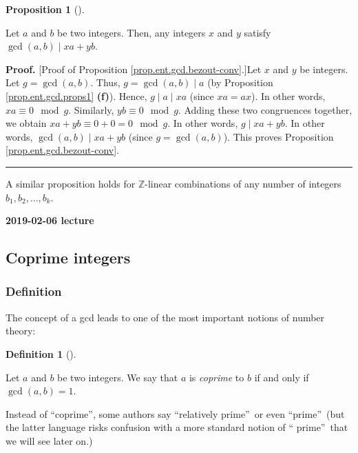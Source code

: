 \documentclass[numbers=enddot,12pt,final,onecolumn,notitlepage]{scrartcl}%
\numberwithin{exer}{subsection}
\theoremstyle{definition}
\newtheorem{prop}[theo]{Proposition}
\newenvironment{proposition}[1][]
{\begin{prop}[#1]\begin{leftbar}}
{\end{leftbar}\end{prop}}
\newtheorem{defi}[theo]{Definition}
\newenvironment{definition}[1][]
{\begin{defi}[#1]\begin{leftbar}}
{\end{leftbar}\end{defi}}
\newenvironment{proof}[1][Proof]{\noindent\textbf{#1.} }{\ \rule{0.5em}{0.5em}}
\begin{document}
\begin{proposition}
\label{prop.ent.gcd.bezout-conv}Let $a$ and $b$ be two integers. Then, any
integers $x$ and $y$ satisfy $\gcd\left(  a, b \right)  \mid xa + yb$.
\end{proposition}

\begin{proof}
[Proof of Proposition \ref{prop.ent.gcd.bezout-conv}.]Let $x$ and $y$ be
integers. Let $g = \gcd\left(  a, b \right)  $. Thus, $g = \gcd\left(  a, b
\right)  \mid a$ (by Proposition \ref{prop.ent.gcd.props1} \textbf{(f)}).
Hence, $g \mid a \mid xa$ (since $xa = ax$). In other words, $xa \equiv0
\mod g$. Similarly, $yb \equiv0 \mod g$. Adding these two congruences
together, we obtain $xa + yb \equiv0 + 0 = 0 \mod g$. In other words, $g \mid
xa + yb$. In other words, $\gcd\left(  a, b \right)  \mid xa + yb$ (since $g =
\gcd\left(  a, b \right)  $). This proves Proposition
\ref{prop.ent.gcd.bezout-conv}.
\end{proof}

A similar proposition holds for $\mathbb{Z}$-linear combinations of any number
of integers $b_{1},b_{2},\ldots,b_{k}$.

\begin{center}
\textbf{2019-02-06 lecture}
\end{center}

\subsection{Coprime integers}

\subsubsection{Definition}

The concept of a gcd leads to one of the most important notions of number theory:

\begin{definition}
\label{def.ent.coprime.coprime}Let $a$ and $b$ be two integers. We say that
$a$ is \textit{coprime} to $b$ if and only if $\gcd\left(  a,b\right)  =1$.
\end{definition}

Instead of \textquotedblleft coprime\textquotedblright, some authors say
\textquotedblleft relatively prime\textquotedblright\ or even
\textquotedblleft prime\textquotedblright\ (but the latter language risks
confusion with a more standard notion of \textquotedblleft
prime\textquotedblright\ that we will see later on.)
\end{document}
